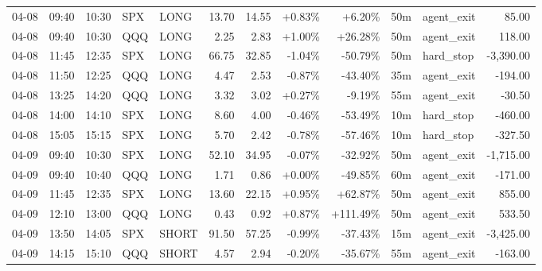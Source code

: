 \documentclass[11pt,a4paper,twoside]{article}
\begin{document}
\begin{center}
\begin{longtable}{>{\color{txtmain}}l l l l l r r r r r >{\color{txtmain}}l r}
04-08 & 09:40 & 10:30 & SPX & LONG & 13.70 & 14.55 & \textcolor{wingreen}{+0.83\%} & \textcolor{wingreen}{+6.20\%} & 50m & agent\_exit & \textcolor{wingreen}{85.00} \\
04-08 & 09:40 & 10:30 & QQQ & LONG & 2.25 & 2.83 & \textcolor{wingreen}{+1.00\%} & \textcolor{wingreen}{+26.28\%} & 50m & agent\_exit & \textcolor{wingreen}{118.00} \\
04-08 & 11:45 & 12:35 & SPX & LONG & 66.75 & 32.85 & \textcolor{lossred}{-1.04\%} & \textcolor{lossred}{-50.79\%} & 50m & hard\_stop & \textcolor{lossred}{-3,390.00} \\
04-08 & 11:50 & 12:25 & QQQ & LONG & 4.47 & 2.53 & \textcolor{lossred}{-0.87\%} & \textcolor{lossred}{-43.40\%} & 35m & agent\_exit & \textcolor{lossred}{-194.00} \\
04-08 & 13:25 & 14:20 & QQQ & LONG & 3.32 & 3.02 & \textcolor{wingreen}{+0.27\%} & \textcolor{lossred}{-9.19\%} & 55m & agent\_exit & \textcolor{lossred}{-30.50} \\
04-08 & 14:00 & 14:10 & SPX & LONG & 8.60 & 4.00 & \textcolor{lossred}{-0.46\%} & \textcolor{lossred}{-53.49\%} & 10m & hard\_stop & \textcolor{lossred}{-460.00} \\
04-08 & 15:05 & 15:15 & SPX & LONG & 5.70 & 2.42 & \textcolor{lossred}{-0.78\%} & \textcolor{lossred}{-57.46\%} & 10m & hard\_stop & \textcolor{lossred}{-327.50} \\
04-09 & 09:40 & 10:30 & SPX & LONG & 52.10 & 34.95 & \textcolor{lossred}{-0.07\%} & \textcolor{lossred}{-32.92\%} & 50m & agent\_exit & \textcolor{lossred}{-1,715.00} \\
04-09 & 09:40 & 10:40 & QQQ & LONG & 1.71 & 0.86 & \textcolor{wingreen}{+0.00\%} & \textcolor{lossred}{-49.85\%} & 60m & agent\_exit & \textcolor{lossred}{-171.00} \\
04-09 & 11:45 & 12:35 & SPX & LONG & 13.60 & 22.15 & \textcolor{wingreen}{+0.95\%} & \textcolor{wingreen}{+62.87\%} & 50m & agent\_exit & \textcolor{wingreen}{855.00} \\
04-09 & 12:10 & 13:00 & QQQ & LONG & 0.43 & 0.92 & \textcolor{wingreen}{+0.87\%} & \textcolor{wingreen}{+111.49\%} & 50m & agent\_exit & \textcolor{wingreen}{533.50} \\
04-09 & 13:50 & 14:05 & SPX & SHORT & 91.50 & 57.25 & \textcolor{lossred}{-0.99\%} & \textcolor{lossred}{-37.43\%} & 15m & agent\_exit & \textcolor{lossred}{-3,425.00} \\
04-09 & 14:15 & 15:10 & QQQ & SHORT & 4.57 & 2.94 & \textcolor{lossred}{-0.20\%} & \textcolor{lossred}{-35.67\%} & 55m & agent\_exit & \textcolor{lossred}{-163.00} \\

\end{longtable}
\end{center}
\end{document}
